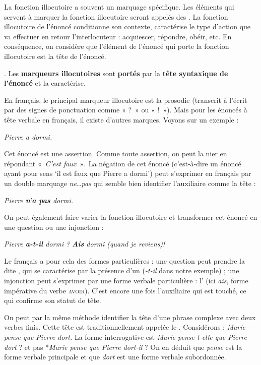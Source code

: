 La fonction illocutoire a souvent un marquage spécifique. Les éléments qui servent à marquer la fonction illocutoire seront appelés des . La fonction illocutoire de l'énoncé conditionne son contexte, caractérise le type d'action que va effectuer en retour l'interlocuteur : acquiescer, répondre, obéir, etc. En conséquence, on considère que l'élément de l'énoncé qui porte la fonction illocutoire est la tête de l'énoncé.

{. Les \textbf{marqueurs illocutoires} sont \textbf{portés} par la \textbf{tête syntaxique de l’énoncé} et la caractérise.}

En français, le principal marqueur illocutoire est la prosodie (transcrit à l’écrit par des signes de ponctuation comme « ?~» ou « !~»). Mais pour les énoncés à tête verbale en français, il existe d’autres marques. Voyons sur un exemple :

\ea
\textit{{Pierre a dormi}.}
\z

Cet énoncé est une assertion. Comme toute assertion, on peut la nier en répondant «~\textit{C’est faux}~».~La négation de cet énoncé (c'est-à-dire un énoncé ayant pour sens ‘il est faux que Pierre a dormi’) peut s’exprimer en français par un double marquage \textit{ne…pas} qui semble bien identifier l’auxiliaire comme la tête :

\ea
\textit{{Pierre} \textbf{{n’a}  {pas}}  {dormi.}}
\z

On peut également faire varier la fonction illocutoire et transformer cet énoncé en une question ou une injonction :

\ea
  \ea \textit{Pierre \textbf{a-t-il} dormi ?}
  \ex \textit{\textbf{Ais}  dormi (quand  je reviens)!}
  \z
\z

Le français a pour cela des formes particulières : une question peut prendre la  dite , qui se caractérise par la présence d’un  (\textit{{}-t-il} dans notre exemple) ; une injonction peut s’exprimer par une forme verbale particulière : l’ (ici \textit{ais}, forme impérative du verbe \textsc{avoir}). C’est encore une fois l’auxiliaire qui est touché, ce qui confirme son statut de tête.

On peut par la même méthode identifier la tête d’une phrase complexe avec deux verbes finis. Cette tête est traditionnellement appelée le . Considérons :
\ea
\textit{{Marie pense que Pierre dort}.}
\z
La forme interrogative est \textit{Marie pense-t-elle que Pierre dort} ? et pas *\textit{Marie pense que Pierre dort-il} ? On en déduit que \textit{pense} est la forme verbale principale et que \textit{dort} est une forme verbale subordonnée.

